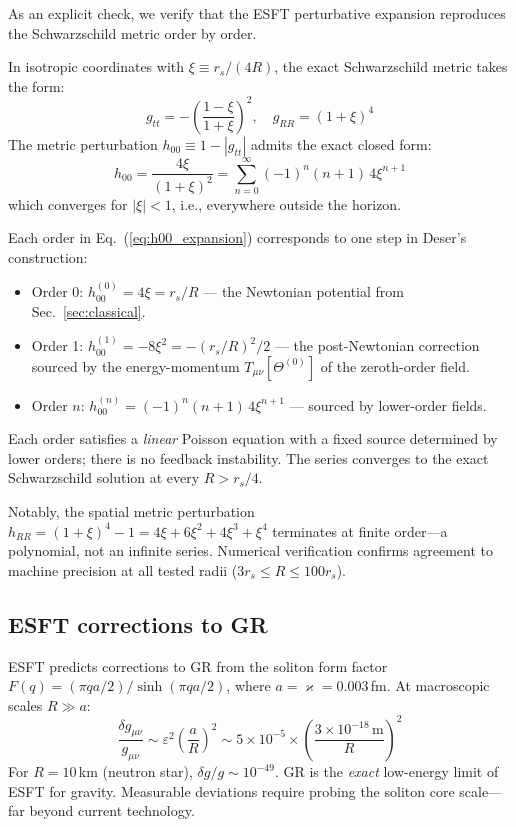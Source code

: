 ﻿\documentclass[twocolumn,preprintnumbers,amsmath,amssymb,prd]{revtex4-2}
\begin{document}
As an explicit check, we verify that the ESFT perturbative expansion reproduces the Schwarzschild metric order by order.

In isotropic coordinates with $\xi \equiv r_s/(4R)$, the exact Schwarzschild metric takes the form:
\begin{equation}
g_{tt} = -\left(\frac{1-\xi}{1+\xi}\right)^2, \quad g_{RR} = (1+\xi)^4
\end{equation}
The metric perturbation $h_{00} \equiv 1 - |g_{tt}|$ admits the exact closed form:
\begin{equation}
h_{00} = \frac{4\xi}{(1+\xi)^2} = \sum_{n=0}^{\infty} (-1)^n(n+1)\,4\xi^{n+1}
\label{eq:h00_expansion}
\end{equation}
which converges for $|\xi| < 1$, i.e., everywhere outside the horizon.

Each order in Eq.~(\ref{eq:h00_expansion}) corresponds to one step in Deser's construction:
\begin{itemize}
\item Order 0: $h_{00}^{(0)} = 4\xi = r_s/R$ --- the Newtonian potential from Sec.~\ref{sec:classical}.
\item Order 1: $h_{00}^{(1)} = -8\xi^2 = -(r_s/R)^2/2$ --- the post-Newtonian correction sourced by the energy-momentum $T_{\mu\nu}[\Theta^{(0)}]$ of the zeroth-order field.
\item Order $n$: $h_{00}^{(n)} = (-1)^n(n+1)\,4\xi^{n+1}$ --- sourced by lower-order fields.
\end{itemize}
Each order satisfies a \emph{linear} Poisson equation with a fixed source determined by lower orders; there is no feedback instability. The series converges to the exact Schwarzschild solution at every $R > r_s/4$.

Notably, the spatial metric perturbation $h_{RR} = (1+\xi)^4 - 1 = 4\xi + 6\xi^2 + 4\xi^3 + \xi^4$ terminates at finite order---a polynomial, not an infinite series. Numerical verification confirms agreement to machine precision at all tested radii ($3r_s \leq R \leq 100r_s$).

\subsection{ESFT corrections to GR}

ESFT predicts corrections to GR from the soliton form factor $F(q) = (\pi qa/2)/\sinh(\pi qa/2)$, where $a = \varkappa = 0.003\,$fm. At macroscopic scales $R \gg a$:
\begin{equation}
\frac{\delta g_{\mu\nu}}{g_{\mu\nu}} \sim \varepsilon^2\left(\frac{a}{R}\right)^2 \sim 5 \times 10^{-5} \times \left(\frac{3 \times 10^{-18}\,\text{m}}{R}\right)^2
\end{equation}
For $R = 10\,$km (neutron star), $\delta g/g \sim 10^{-49}$. GR is the \emph{exact} low-energy limit of ESFT for gravity. Measurable deviations require probing the soliton core scale---far beyond current technology.
\end{document}
